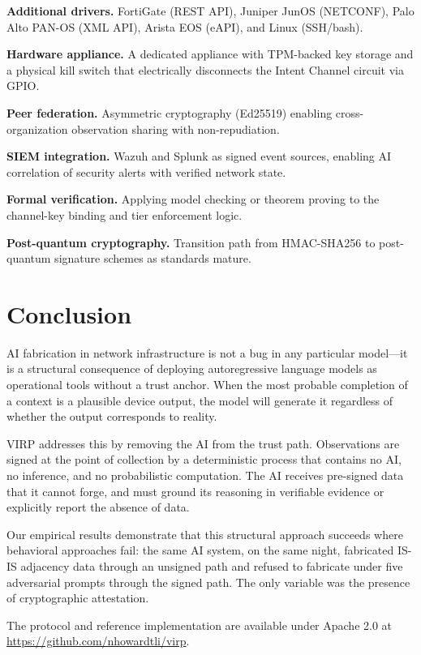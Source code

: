 \documentclass[11pt,twocolumn]{article}
\begin{document}
\textbf{Additional drivers.} FortiGate (REST API), Juniper JunOS (NETCONF), Palo Alto PAN-OS (XML API), Arista EOS (eAPI), and Linux (SSH/bash).

\textbf{Hardware appliance.} A dedicated appliance with TPM-backed key storage and a physical kill switch that electrically disconnects the Intent Channel circuit via GPIO.

\textbf{Peer federation.} Asymmetric cryptography (Ed25519) enabling cross-organization observation sharing with non-repudiation.

\textbf{SIEM integration.} Wazuh and Splunk as signed event sources, enabling AI correlation of security alerts with verified network state.

\textbf{Formal verification.} Applying model checking or theorem proving to the channel-key binding and tier enforcement logic.

\textbf{Post-quantum cryptography.} Transition path from HMAC-SHA256 to post-quantum signature schemes as standards mature.

\section{Conclusion}

AI fabrication in network infrastructure is not a bug in any particular model---it is a structural consequence of deploying autoregressive language models as operational tools without a trust anchor. When the most probable completion of a context is a plausible device output, the model will generate it regardless of whether the output corresponds to reality.

VIRP addresses this by removing the AI from the trust path. Observations are signed at the point of collection by a deterministic process that contains no AI, no inference, and no probabilistic computation. The AI receives pre-signed data that it cannot forge, and must ground its reasoning in verifiable evidence or explicitly report the absence of data.

Our empirical results demonstrate that this structural approach succeeds where behavioral approaches fail: the same AI system, on the same night, fabricated IS-IS adjacency data through an unsigned path and refused to fabricate under five adversarial prompts through the signed path. The only variable was the presence of cryptographic attestation.

The protocol and reference implementation are available under Apache 2.0 at \url{https://github.com/nhowardtli/virp}.
\end{document}
